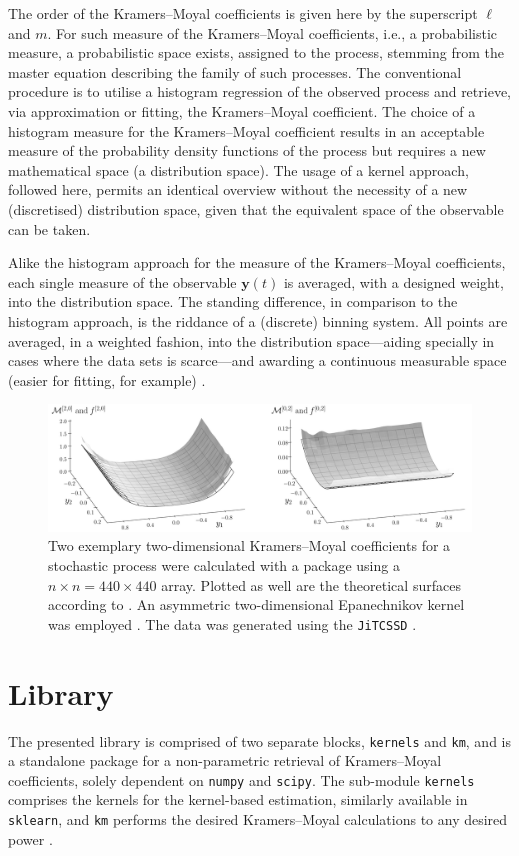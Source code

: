 \documentclass[showpacs,showkeys,10pt,onecolumn,superscriptaddress,notitlepage]{revtex4-1}
\begin{document}
The order of the Kramers--Moyal coefficients is given here by the superscript $\ell$ and $m$.
For such measure of the Kramers--Moyal coefficients, i.e., a probabilistic measure, a probabilistic space exists, assigned to the process, stemming from the master equation describing the family of such processes.
The conventional procedure is to utilise a histogram regression of the observed process and retrieve, via approximation or fitting, the Kramers--Moyal coefficient.
The choice of a histogram measure for the Kramers--Moyal coefficient results in an acceptable measure of the probability density functions of the process but requires a new mathematical space (a distribution space).
The usage of a kernel approach, followed here, permits an identical overview without the necessity of a new (discretised) distribution space, given that the equivalent space of the observable can be taken.

Alike the histogram approach for the measure of the Kramers--Moyal coefficients, each single measure of the observable $\boldsymbol{y}(t)$ is averaged, with a designed weight, into the distribution space.
The standing difference, in comparison to the histogram approach, is the riddance of a (discrete) binning system.
All points are averaged, in a weighted fashion, into the distribution space---aiding specially in cases where the data sets is scarce---and awarding a continuous measurable space (easier for fitting, for example) \cite{Lamouroux}.

\begin{figure}[h]
    \centering
    \includegraphics[width=0.9\linewidth]{figure.png}
    \caption{Two exemplary two-dimensional Kramers--Moyal coefficients for a stochastic process were calculated with a package using a $n\times n = 440\times 440$ array. Plotted as well are the theoretical surfaces according to \cite{Anvari}. An asymmetric two-dimensional Epanechnikov kernel was employed \cite{Epanechnikov,Lamouroux}. The data was generated using the \texttt{JiTCSSD} \cite{Ansmann}.}
\end{figure}

\section{Library}
The presented library is comprised of two separate blocks, \texttt{kernels} and \texttt{km}, and is a standalone package for a non-parametric retrieval of Kramers--Moyal coefficients, solely dependent on \texttt{numpy} and \texttt{scipy}. The sub-module \texttt{kernels} comprises the kernels for the kernel-based estimation, similarly available in \texttt{sklearn}, and \texttt{km} performs the desired Kramers--Moyal calculations to any desired power \cite{scikitlearn}.
\end{document}
